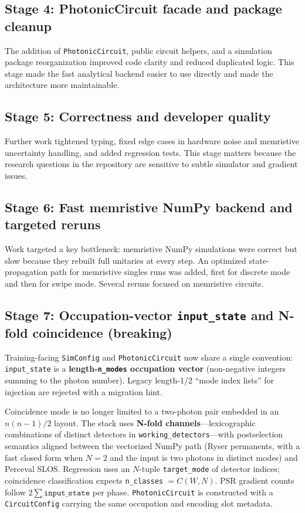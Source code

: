 \documentclass[11pt,a4paper]{article}
\begin{document}
\subsection{Stage 4: PhotonicCircuit facade and package cleanup}
The addition of \texttt{PhotonicCircuit}, public circuit helpers, and a simulation package reorganization improved code clarity and reduced duplicated logic. This stage made the fast analytical backend easier to use directly and made the architecture more maintainable.

\subsection{Stage 5: Correctness and developer quality}
Further work tightened typing, fixed edge cases in hardware noise and memristive uncertainty handling, and added regression tests. This stage matters because the research questions in the repository are sensitive to subtle simulator and gradient issues.

\subsection{Stage 6: Fast memristive NumPy backend and targeted reruns}
Work targeted a key bottleneck: memristive NumPy simulations were correct but slow because they rebuilt full unitaries at every step. An optimized state-propagation path for memristive singles runs was added, first for discrete mode and then for swipe mode. Several reruns focused on memristive circuits.

\subsection{Stage 7: Occupation-vector \texttt{input\_state} and N-fold coincidence (breaking)}
Training-facing \texttt{SimConfig} and \texttt{PhotonicCircuit} now share a single convention: \texttt{input\_state} is a \textbf{length-\texttt{n\_modes} occupation vector} (non-negative integers summing to the photon number). Legacy length-1/2 ``mode index lists'' for injection are rejected with a migration hint.

Coincidence mode is no longer limited to a two-photon pair embedded in an \(n(n-1)/2\) layout. The stack uses \textbf{N-fold channels}---lexicographic combinations of distinct detectors in \texttt{working\_detectors}---with postselection semantics aligned between the vectorized NumPy path (Ryser permanents, with a fast closed form when \(N=2\) and the input is two photons in distinct modes) and Perceval SLOS. Regression uses an \(N\)-tuple \texttt{target\_mode} of detector indices; coincidence classification expects \texttt{n\_classes} \(= C(W,N)\). PSR gradient counts follow \(2\sum\texttt{input\_state}\) per phase. \texttt{PhotonicCircuit} is constructed with a \texttt{CircuitConfig} carrying the same occupation and encoding slot metadata.
\end{document}
